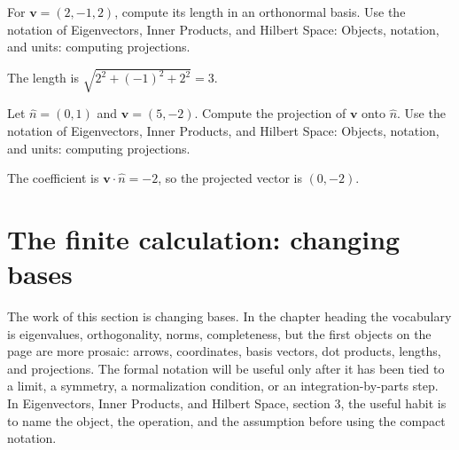 \begin{exercise}
For \(\bm v=(2,-1,2)\), compute its length in an orthonormal basis.  Use the notation of Eigenvectors, Inner Products, and Hilbert Space: Objects, notation, and units: computing projections.
\begin{answer}
The length is \(\sqrt{2^2+(-1)^2+2^2}=3\).
\end{answer}
\end{exercise}

\begin{exercise}
Let \(\hat n=(0,1)\) and \(\bm v=(5,-2)\).  Compute the projection of \(\bm v\) onto \(\hat n\).  Use the notation of Eigenvectors, Inner Products, and Hilbert Space: Objects, notation, and units: computing projections.
\begin{answer}
The coefficient is \(\bm v\cdot\hat n=-2\), so the projected vector is \((0,-2)\).
\end{answer}
\end{exercise}



\section{The finite calculation: changing bases}













The work of this section is changing bases.  In the chapter heading the vocabulary is eigenvalues, orthogonality, norms, completeness, but the first objects on the page are more prosaic: arrows, coordinates, basis vectors, dot products, lengths, and projections.  The formal notation will be useful only after it has been tied to a limit, a symmetry, a normalization condition, or an integration-by-parts step.  In Eigenvectors, Inner Products, and Hilbert Space, section 3, the useful habit is to name the object, the operation, and the assumption before using the compact notation.

